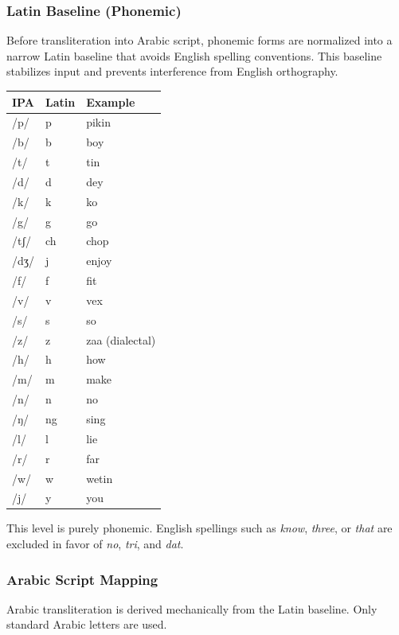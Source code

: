 \documentclass[12pt]{article}
\begin{document}
\subsubsection{Latin Baseline (Phonemic)}

Before transliteration into Arabic script, phonemic forms are normalized into a narrow Latin baseline that avoids English spelling conventions. This baseline stabilizes input and prevents interference from English orthography.

\begin{center}
\begin{tabular}{lll}
IPA & Latin & Example \\
\hline
/p/ & p & pikin \\
/b/ & b & boy \\
/t/ & t & tin \\
/d/ & d & dey \\
/k/ & k & ko \\
/g/ & g & go \\
/tʃ/ & ch & chop \\
/dʒ/ & j & enjoy \\
/f/ & f & fit \\
/v/ & v & vex \\
/s/ & s & so \\
/z/ & z & zaa (dialectal) \\
/h/ & h & how \\
/m/ & m & make \\
/n/ & n & no \\
/ŋ/ & ng & sing \\
/l/ & l & lie \\
/r/ & r & far \\
/w/ & w & wetin \\
/j/ & y & you \\
\end{tabular}
\end{center}

This level is purely phonemic. English spellings such as \textit{know}, \textit{three}, or \textit{that} are excluded in favor of \textit{no}, \textit{tri}, and \textit{dat}.

\subsubsection{Arabic Script Mapping}

Arabic transliteration is derived mechanically from the Latin baseline. Only standard Arabic letters are used.
\end{document}
